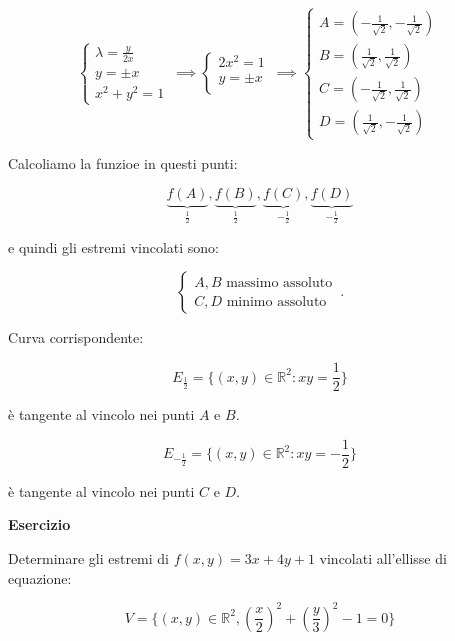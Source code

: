 \documentclass[../appunti-analisi.tex]{subfiles}
\begin{document}
\[
        \begin{cases}
               \lambda= \frac{y}{2x}\\
               y= \pm x\\
               x^{2}+ y^{2}= 1
        \end{cases}\, \implies
        \begin{cases}
               2x^{2}=1\\
               y= \pm x\\
        \end{cases}\, \implies
        \begin{cases}
               A=( - \frac{1}{\sqrt{2}}, - \frac{1}{\sqrt{2}})\\
               B= ( \frac{1}{\sqrt{2}}, \frac{1}{\sqrt{2}})\\
               C=( - \frac{1}{\sqrt{2}},  \frac{1}{\sqrt{2}})\\
               D=(  \frac{1}{\sqrt{2}}, - \frac{1}{\sqrt{2}})
        \end{cases}\, 
\]

Calcoliamo la funzioe in questi punti:

\[
    \underbrace{f(A)}_\text{$\frac{1}{2}$},\underbrace{f(B)}_\text{$\frac{1}{2}$},\underbrace{f(C)}_\text{$-\frac{1}{2}$},\underbrace{f(D)}_\text{$- \frac{1}{2}$}
\]

e quindi gli estremi vincolati sono:

\[
        \begin{cases}
            A,B \text{ massimo assoluto}\\
            C,D \text{ minimo assoluto}
        \end{cases}\,.
\]

Curva corrispondente:

\[
    E_{ \frac{1}{2}} = \{(x,y) \in \mathbb{R}^{2}: xy= \frac{1}{2}\}
\]

è tangente al vincolo nei punti $A$ e $B$.

\[
    E_{ -\frac{1}{2}} = \{(x,y) \in \mathbb{R}^{2}: xy=- \frac{1}{2}\}
\]

è tangente al vincolo nei punti $C$ e $D$.

\newpage

\textbf{Esercizio} 

Determinare gli estremi di $f(x,y) = 3x + 4y +1$ vincolati all'ellisse di equazione:

\[
    V= \{(x,y) \in \mathbb{R}^{2}, (\frac{x}{2})^{2}+ (\frac{y}{3})^{2}-1=0\}
\]
\end{document}
